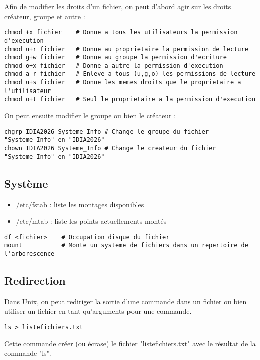 \documentclass{article}
\begin{document}
Afin de modifier les droits d'un fichier, on peut d'abord agir sur les droits créateur, groupe et autre :

\begin{lstlisting}
chmod +x fichier    # Donne a tous les utilisateurs la permission d'execution
chmod u+r fichier   # Donne au proprietaire la permission de lecture
chmod g+w fichier   # Donne au groupe la permission d'ecriture
chmod o+x fichier   # Donne a autre la permission d'execution
chmod a-r fichier   # Enleve a tous (u,g,o) les permissions de lecture
chmod u+s fichier   # Donne les memes droits que le proprietaire a l'utilisateur
chmod o+t fichier   # Seul le proprietaire a la permission d'execution
\end{lstlisting}

On peut ensuite modifier le groupe ou bien le créateur :

\begin{lstlisting}
chgrp IDIA2026 Systeme_Info # Change le groupe du fichier "Systeme_Info" en "IDIA2026"
chown IDIA2026 Systeme_Info # Change le createur du fichier "Systeme_Info" en "IDIA2026"
\end{lstlisting}

\subsection{Système}
\begin{itemize}
  \item /etc/fstab : liste les montages disponibles
  \item /etc/mtab : liste les points actuellements montés
\end{itemize}
\begin{lstlisting}
df <fichier>    # Occupation disque du fichier
mount           # Monte un systeme de fichiers dans un repertoire de l'arborescence
\end{lstlisting}

\subsection{Redirection}
Dans Unix, on peut rediriger la sortie d'une commande dans un fichier ou bien utiliser un fichier en tant qu'arguments pour une commande.
\begin{lstlisting}
ls > listefichiers.txt
\end{lstlisting}

Cette commande créer (ou écrase) le fichier "listefichiers.txt" avec le résultat de la commande "ls".
\end{document}

